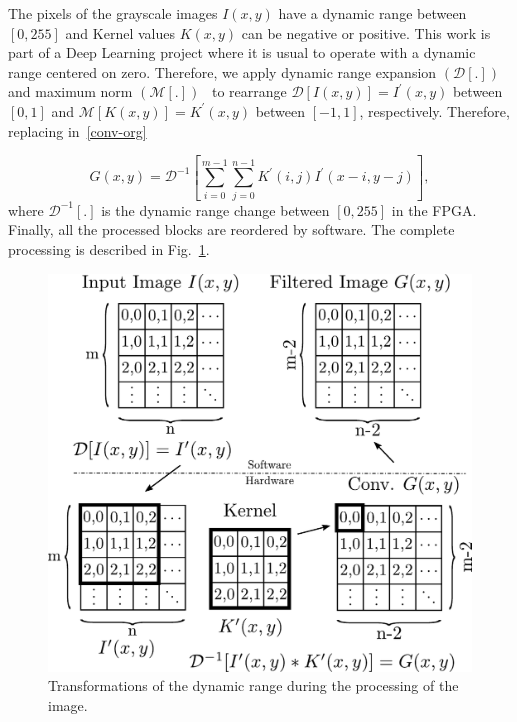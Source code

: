 \documentclass[conference,compsoc]{IEEEtran}
\begin{document}
The pixels of the grayscale images $I(x,y)$ have a dynamic range between
$[0,255]$ and Kernel values $K(x,y)$ can be negative or positive. This work is
part of a Deep Learning project where it is usual to operate with a dynamic
range centered on zero. Therefore, we apply dynamic range expansion
$(\mathcal{D}[.])$~\cite{dinamic_rango} and maximum norm
$(\mathcal{M}[.])$~\cite{max_norm} to rearrange
$\mathcal{D}[I(x,y)]=I^\prime(x,y)$ between $[0,1]$ and
$\mathcal{M}[K(x,y)]=K^\prime(x,y)$ between $[-1,1]$, respectively. Therefore,
replacing in~\eqref{conv-org}

\begin{equation}\label{conv-org1}
  G(x,y) = \mathcal{D}^{-1}\left[\sum_{i=0}^{m-1} \sum_{j=0}^{n-1}K^\prime(i,j)I^\prime(x-i,y-j)\right],
\end{equation}
where $\mathcal{D}^{-1}[.]$ is the dynamic range change between $[0,255]$ in the
FPGA. Finally, all the processed blocks are reordered by software.
The complete processing is described in Fig.~\ref{transformation}.


\begin{figure}[!t]
\centering
\includegraphics[scale=0.47]{wflow3}
\caption{Transformations of the dynamic range during the processing of the image.}
\label{transformation}
\end{figure}

\end{document}
